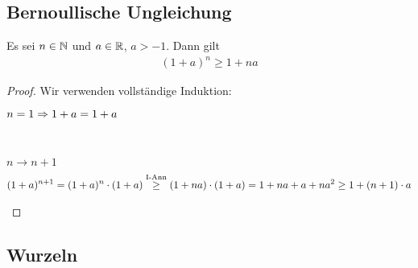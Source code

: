 \subsection{Bernoullische Ungleichung}

\begin{satz}
    Es sei $n\in\mathbb{N}$ und $a\in\mathbb{R}$, $a > -1$. Dann gilt
    \begin{align*}
    (1+a)
        ^n \geq 1+na
    \end{align*}
    \begin{proof}
        Wir verwenden vollständige Induktion:\\
        \begin{induktionsanfang}
            $n=1 \Rightarrow{} 1+a = 1+a$
        \end{induktionsanfang}
        \\
        \begin{induktionsschritt}
            $n\rightarrow n+1$
            \begin{align*}
            (1+a)
                ^{n+1} = (1+a)^n\cdot (1+a) \overset{\text{I-Ann}}{\geq} (1+na)\cdot(1+a) = 1+na+a+na^2\geq 1+(n+1)\cdot a
            \end{align*}
        \end{induktionsschritt}
    \end{proof}
\end{satz}


\newpage

\subsection{Wurzeln}

